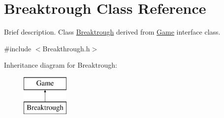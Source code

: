 \hypertarget{class_breaktrough}{\section{Breaktrough Class Reference}
\label{class_breaktrough}
}


Brief description. Class \hyperlink{class_breaktrough}{Breaktrough} derived from \hyperlink{class_game}{Game} interface class.  




{\ttfamily \#include $<$Breakthrough.\-h$>$}

Inheritance diagram for Breaktrough\-:\begin{figure}[H]
\begin{center}
\leavevmode
\includegraphics[height=2.000000cm]{class_breaktrough}
\end{center}
\end{figure}
